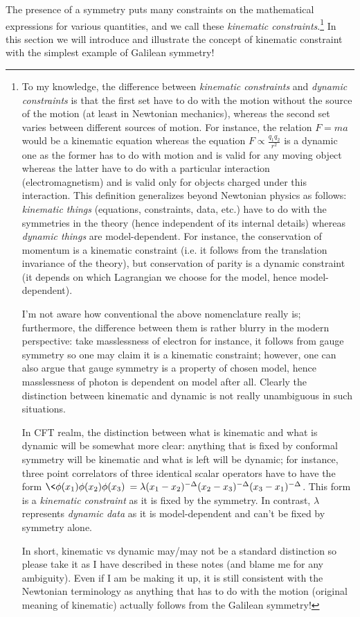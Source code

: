 \documentclass[12pt]{article}
\numberwithin{equation}{section}
\begin{document}
The presence of a symmetry puts many constraints on the mathematical expressions for various quantities, and we call these \emph{kinematic constraints}.\footnote{
To my knowledge, the difference between \emph{kinematic constraints} and \emph{dynamic constraints} is that the first set have to do with the motion without the source of the motion (at least in Newtonian mechanics), whereas the second set varies between different sources of motion. For instance, the relation $F=ma$ would be a kinematic equation whereas the equation $F\propto\frac{q_1q_2}{r^2}$ is a dynamic one as the former has to do with motion and is valid for any moving  object whereas the latter have to do with a particular interaction (electromagnetism) and is valid only for objects charged under this interaction. This definition generalizes beyond Newtonian physics as follows: \emph{kinematic things} (equations, constraints, data, etc.) have to do with the symmetries in the theory (hence independent of its internal details) whereas \emph{dynamic things} are model-dependent. For instance, the conservation of momentum is a kinematic constraint (i.e. it follows from the translation invariance of the theory), but conservation of parity is a dynamic constraint (it depends on which Lagrangian we choose for the model, hence model-dependent). 

I'm not aware how conventional the above nomenclature really is; furthermore, the difference between them is rather blurry in the modern perspective: take masslessness of electron for instance, it follows from gauge symmetry so one may claim it is a kinematic constraint; however, one can also argue that gauge symmetry is a property of chosen model, hence masslessness of photon is dependent on model after all. Clearly the distinction between kinematic and dynamic is not really unambiguous in such situations.

In CFT realm, the distinction between what is kinematic and what is dynamic will be somewhat more clear: anything that is fixed by conformal symmetry will be kinematic and what is left will be dynamic; for instance, three point correlators of three identical scalar operators have to have the form $\<\f(x_1)\f(x_2)\f(x_3)\>=\lambda (x_1-x_2)^{-\De}(x_2-x_3)^{-\De}(x_3-x_1)^{-\De}$. This form is a \emph{kinematic constraint} as it is fixed by the symmetry. In contrast, $\lambda$ represents \emph{dynamic data} as it is model-dependent and can't be fixed by symmetry alone.

In short, kinematic vs dynamic may/may not be a standard distinction so please take it as I have described in these notes (and blame me for any ambiguity). Even if I am be making it up, it is still consistent with the Newtonian terminology as anything that has to do with the motion (original meaning of kinematic) actually follows from the Galilean symmetry!
} In this section we will introduce and illustrate the concept of kinematic constraint with the simplest example of Galilean symmetry!
\end{document}

